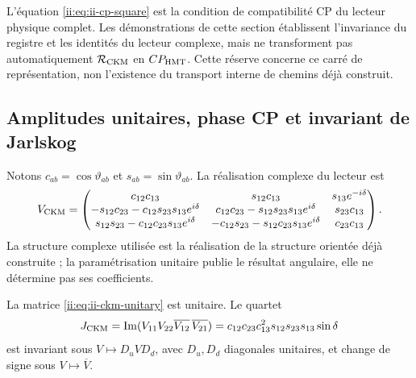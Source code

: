\begin{remark}
L’équation \eqref{ii:eq:ii-cp-square} est la condition de
compatibilité CP du lecteur physique complet.
Les démonstrations de cette section établissent l’invariance du
registre et les identités du lecteur complexe, mais ne transforment pas
automatiquement \(\mathcal R_{\rm CKM}\) en \(CP_{\rm HMT}\).
Cette réserve concerne ce carré de représentation, non
l’existence du transport interne de chemins déjà construit.
\end{remark}

\subsection{Amplitudes unitaires, phase CP et invariant de Jarlskog}

Notons \(c_{ab}=\cos\vartheta_{ab}\) et
\(s_{ab}=\sin\vartheta_{ab}\). La réalisation complexe du lecteur est
\begingroup
\small
\setlength{\arraycolsep}{3pt}
\begin{equation}
 V_{\rm CKM}=
 \begin{pmatrix}
 c_{12}c_{13}&s_{12}c_{13}&s_{13}e^{-i\delta}\\
 -s_{12}c_{23}-c_{12}s_{23}s_{13}e^{i\delta}&
 c_{12}c_{23}-s_{12}s_{23}s_{13}e^{i\delta}&s_{23}c_{13}\\
 s_{12}s_{23}-c_{12}c_{23}s_{13}e^{i\delta}&
 -c_{12}s_{23}-s_{12}c_{23}s_{13}e^{i\delta}&c_{23}c_{13}
 \end{pmatrix}.
 \label{ii:eq:ii-ckm-unitary}
\end{equation}
\endgroup
La structure complexe utilisée est la réalisation de la structure
orientée déjà construite ; la paramétrisation unitaire publie le résultat
angulaire, elle ne détermine pas ses coefficients.

\begin{proposition}
La matrice \eqref{ii:eq:ii-ckm-unitary} est unitaire. Le quartet
\begin{equation}
 J_{\rm CKM}
 =\operatorname{Im}
   (V_{11}V_{22}\overline{V_{12}}\,\overline{V_{21}})
 =c_{12}c_{23}c_{13}^2s_{12}s_{23}s_{13}\sin\delta
 \label{ii:eq:ii-jarlskog}
\end{equation}
est invariant sous \(V\mapsto D_uVD_d\), avec \(D_u,D_d\) diagonales
unitaires, et change de signe sous \(V\mapsto\overline V\).
\end{proposition}

